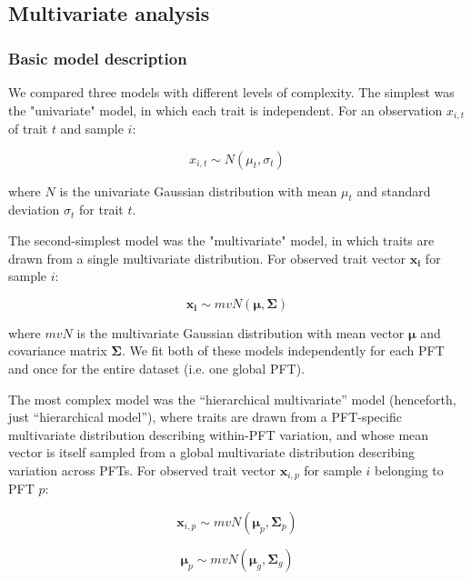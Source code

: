 \documentclass{article}
\begin{document}
\subsection{Multivariate analysis}

\subsubsection{Basic model description}

We compared three models with different levels of complexity.
The simplest was the "univariate" model, in which each trait is independent.
For an observation $x_{i,t}$ of trait $t$ and sample $i$:

\begin{equation}
x_{i,t} \sim N(\mu_t, \sigma_t)
\end{equation}

where $N$ is the univariate Gaussian distribution with mean $\mu_t$ and standard deviation $\sigma_t$ for trait $t$.

The second-simplest model was the "multivariate" model, in which traits are drawn from a single multivariate distribution.
For observed trait vector ${\mathbf{x_i}}$ for sample $i$:

\begin{equation}
\mathbf{x_i} \sim mvN(\mathbf{\mu}, \mathbf{\Sigma})
\end{equation}

where $mvN$ is the multivariate Gaussian distribution with mean vector $\mathbf{\mu}$ and covariance matrix $\mathbf{\Sigma}$.
We fit both of these models independently for each PFT and once for the entire dataset (i.e. one global PFT).

The most complex model was the ``hierarchical multivariate'' model (henceforth, just ``hierarchical model''),
where traits are drawn from a PFT-specific multivariate distribution describing within-PFT variation,
and whose mean vector is itself sampled from a global multivariate distribution describing variation across PFTs.
For observed trait vector $\mathbf{x}_{i,p}$ for sample $i$ belonging to PFT $p$:

\begin{equation}
\mathbf{x}_{i,p} \sim mvN(\mathbf{\mu}_p, \mathbf{\Sigma}_p)
\end{equation}

\begin{equation}
\mathbf{\mu}_p \sim mvN(\mathbf{\mu}_g, \mathbf{\Sigma}_g)
\end{equation}
\end{document}
